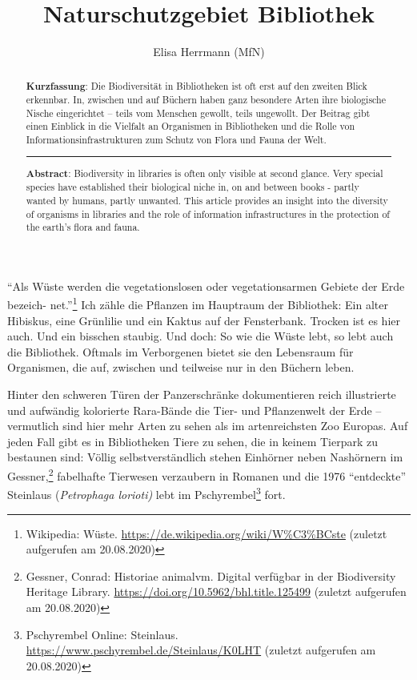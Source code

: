 \documentclass[a4paper,
fontsize=11pt,
oneside,
numbers=noperiodatend,
parskip=half-,
bibliography=totoc,
final
]{scrartcl}
\title{\LARGE{Naturschutzgebiet Bibliothek}}%
\author{Elisa Herrmann (MfN)} %
\date{}
\begin{document}
\maketitle
\thispagestyle{fancyplain} 

\begin{abstract}
\noindent
\textbf{Kurzfassung}: Die Biodiversität in Bibliotheken ist oft erst auf
den zweiten Blick erkennbar. In, zwischen und auf Büchern haben ganz
besondere Arten ihre biologische Nische eingerichtet -- teils vom
Menschen gewollt, teils ungewollt. Der Beitrag gibt einen Einblick in
die Vielfalt an Organismen in Bibliotheken und die Rolle von
Informationsinfrastrukturen zum Schutz von Flora und Fauna der Welt.

\begin{center}\rule{0.5\linewidth}{0.5pt}\end{center}

\noindent\textbf{Abstract}: Biodiversity in libraries is often only visible at
second glance. Very special species have established their biological
niche in, on and between books - partly wanted by humans, partly
unwanted. This article provides an insight into the diversity of
organisms in libraries and the role of information infrastructures in
the protection of the earth's flora and fauna.
\end{abstract}

\enquote{Als Wüste werden die vegetationslosen oder vegetationsarmen
Gebiete der Erde bezeich- \linebreak net.}\footnote{Wikipedia: Wüste.
  \url{https://de.wikipedia.org/wiki/W\%C3\%BCste} (zuletzt aufgerufen
  am 20.08.2020)} Ich zähle die Pflanzen im Hauptraum der Bibliothek:
Ein alter Hibiskus, eine Grünlilie und ein Kaktus auf der Fensterbank.
Trocken ist es hier auch. Und ein bisschen staubig. Und doch: So wie die
Wüste lebt, so lebt auch die Bibliothek. Oftmals im Verborgenen bietet
sie den Lebensraum für Organismen, die auf, zwischen und teilweise nur
in den Büchern leben.

Hinter den schweren Türen der Panzerschränke dokumentieren reich
illustrierte und aufwändig kolorierte Rara-Bände die Tier- und
Pflanzenwelt der Erde -- vermutlich sind hier mehr Arten zu sehen als im
artenreichsten Zoo Europas. Auf jeden Fall gibt es in Bibliotheken Tiere
zu sehen, die in keinem Tierpark zu bestaunen sind: Völlig
selbstverständlich stehen Einhörner neben Nashörnern im
Gessner,\footnote{Gessner, Conrad: Historiae animalvm. Digital verfügbar
  in der Biodiversity Heritage Library.
  \url{https://doi.org/10.5962/bhl.title.125499} (zuletzt aufgerufen am
  20.08.2020)} fabelhafte Tierwesen verzaubern in Romanen und die 1976
\enquote{entdeckte} Steinlaus (\emph{Petrophaga lorioti)} lebt im
Pschyrembel\footnote{Pschyrembel Online: Steinlaus.
  \url{https://www.pschyrembel.de/Steinlaus/K0LHT} (zuletzt aufgerufen
  am 20.08.2020)} fort.
\end{document}
